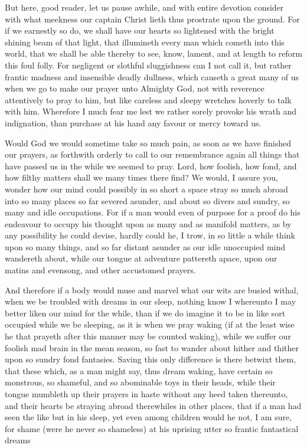 \documentclass[a5paper]{scrbook}
\begin{document}
	But here, good reader, let us pause awhile, and with entire devotion consider with what meekness our captain Christ lieth thus prostrate upon the ground. For if we earnestly so do, we shall have our hearts so lightened with the bright shining beam of that light, that illumineth every man which cometh into this world, that we shall be able thereby to see, know, lament, and at length to reform this foul folly. For negligent or slothful sluggishness can I not call it, but rather frantic madness and insensible deadly dullness, which causeth a great many of us when we go to make our prayer unto Almighty God, not with reverence attentively to pray to him, but like careless and sleepy wretches hoverly to talk with him. Wherefore I much fear me lest we rather sorely provoke his wrath and indignation, than purchase at his hand any favour or mercy toward us.
	
	Would God we would sometime take so much pain, as soon as we have finished our prayers, as forthwith orderly to call to our remembrance again all things that have passed us in the while we seemed to pray. Lord, how foolish, how fond, and how filthy matters shall we many times there find? We would, I assure you, wonder how our mind could possibly in so short a space stray so much abroad into so many places so far severed asunder, and about so divers and sundry, so many and idle occupations. For if a man would even of purpose for a proof do his endeavour to occupy his thought upon as many and as manifold matters, as by any possibility he could devise, hardly could he, I trow, in so little a while think upon so many things, and so far distant asunder as our idle unoccupied mind wandereth about, while our tongue at adventure pattereth apace, upon our matins and evensong, and other accustomed prayers.
	
	
	And therefore if a body would muse and marvel what our wits are busied withal, when we be troubled with dreams in our sleep, nothing know I whereunto I may better liken our mind for the while, than if we do imagine it to be in like sort occupied while we be sleeping, as it is when we pray waking (if at the least wise he that prayeth after this manner may be counted waking), while we suffer our foolish mad brain in the mean season, so fast to wander about hither and thither upon so sundry fond fantasies. Saving this only difference is there betwixt them, that these which, as a man might say, thus dream waking, have certain so monstrous, so shameful, and so abominable toys in their heads, while their tongue mumbleth up their prayers in haste without any heed taken thereunto, and their hearts be straying abroad therewhiles in other places, that if a man had seen the like but in his sleep, yet even among children would he not, I am sure, for shame (were he never so shameless) at his uprising utter so frantic fantastical dreams
	
\end{document}
